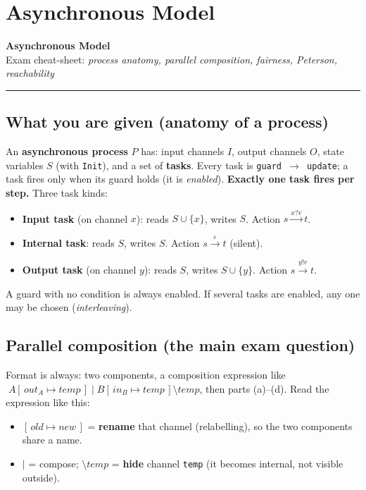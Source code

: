 \chapter{Asynchronous Model}

\begin{center}
{\Large\bfseries Asynchronous Model}\\[1pt]
{\small Exam cheat-sheet: \emph{process anatomy, parallel composition, fairness, Peterson, reachability}}
\end{center}
\hrule
\vspace{4pt}

\section{What you are given (anatomy of a process)}
An \textbf{asynchronous process} $P$ has: input channels $I$, output channels $O$, state variables $S$ (with \texttt{Init}), and a set of \textbf{tasks}. Every task is \texttt{guard $\rightarrow$ update}; a task fires only when its guard holds (it is \emph{enabled}). \textbf{Exactly one task fires per step.} Three task kinds:
\begin{itemize}
  \item \textbf{Input task} (on channel $x$): reads $S\cup\{x\}$, writes $S$. Action $s \xrightarrow{x?v} t$.
  \item \textbf{Internal task}: reads $S$, writes $S$. Action $s \xrightarrow{\varepsilon} t$ (silent).
  \item \textbf{Output task} (on channel $y$): reads $S$, writes $S\cup\{y\}$. Action $s \xrightarrow{y!v} t$.
\end{itemize}
A guard with no condition is always enabled. If several tasks are enabled, any one may be chosen (\emph{interleaving}).

\section{Parallel composition (the main exam question)}
Format is always: two components, a composition expression like
$\;A[\,out_A \mapsto temp\,]\;|\;B[\,in_B \mapsto temp\,]\setminus temp$,
then parts (a)--(d). Read the expression like this:
\begin{itemize}
  \item $[\,old \mapsto new\,]$ = \textbf{rename} that channel (relabelling), so the two components share a name.
  \item $|$ = compose; $\setminus temp$ = \textbf{hide} channel \texttt{temp} (it becomes internal, not visible outside).
\end{itemize}

